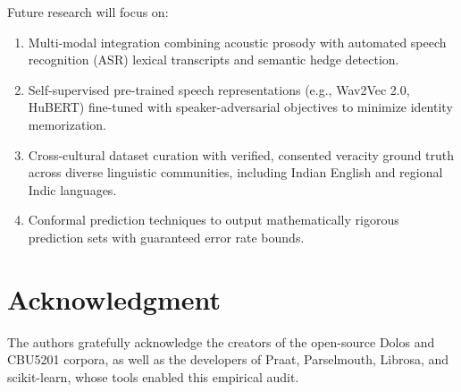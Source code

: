 \documentclass[conference]{IEEEtran}
\begin{document}
Future research will focus on:
\begin{enumerate}
    \item Multi-modal integration combining acoustic prosody with automated speech recognition (ASR) lexical transcripts and semantic hedge detection.
    \item Self-supervised pre-trained speech representations (e.g., Wav2Vec 2.0, HuBERT) fine-tuned with speaker-adversarial objectives to minimize identity memorization.
    \item Cross-cultural dataset curation with verified, consented veracity ground truth across diverse linguistic communities, including Indian English and regional Indic languages.
    \item Conformal prediction techniques to output mathematically rigorous prediction sets with guaranteed error rate bounds.
\end{enumerate}

\section*{Acknowledgment}
The authors gratefully acknowledge the creators of the open-source Dolos and CBU5201 corpora, as well as the developers of Praat, Parselmouth, Librosa, and scikit-learn, whose tools enabled this empirical audit.



\end{document}
